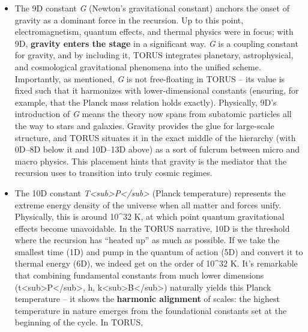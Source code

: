 \documentclass[]{article}
\begin{document}
{{\begin{itemize}
  marks the fully developed classical thermodynamics regime (PV = nRT,
  etc.), and having \emph{R} in the list explicitly acknowledges that
  the recursion has now reached the continuum limit of matter. It is a
  reassurance that what emerges at 8D is \emph{identical} to what we
  know from classical thermodynamics -- a continuity check.
\item
  The 9D constant \emph{G} (Newton's gravitational constant) anchors the
  onset of gravity as a dominant force in the recursion. Up to this
  point, electromagnetism, quantum effects, and thermal physics were in
  focus; with 9D, \textbf{gravity enters the stage} in a significant
  way. \emph{G} is a coupling constant for gravity, and by including it,
  TORUS integrates planetary, astrophysical, and cosmological
  gravitational phenomena into the unified scheme. Importantly, as
  mentioned, \emph{G} is not free-floating in TORUS -- its value is
  fixed such that it harmonizes with lower-dimensional constants
  (ensuring, for example, that the Planck mass relation holds exactly)​.
  Physically, 9D's introduction of \emph{G} means the theory now spans
  from subatomic particles all the way to stars and galaxies. Gravity
  provides the glue for large-scale structure, and TORUS situates it in
  the exact middle of the hierarchy (with 0D--8D below it and 10D--13D
  above) as a sort of fulcrum between micro and macro physics. This
  placement hints that gravity is the mediator that the recursion uses
  to transition into truly cosmic regimes.
\item
  The 10D constant
  \emph{T\textless{}sub\textgreater{}P\textless{}/sub\textgreater{}}
  (Planck temperature) represents the extreme energy density of the
  universe when all matter and forces unify. Physically, this is around
  10\^{}32 K, at which point quantum gravitational effects become
  unavoidable. In the TORUS narrative, 10D is the threshold where the
  recursion has ``heated up'' as much as possible​. If we take the
  smallest time (1D) and pump in the quantum of action (5D) and convert
  it to thermal energy (6D), we indeed get on the order of 10\^{}32 K​.
  It's remarkable that combining fundamental constants from much lower
  dimensions
  (t\textless{}sub\textgreater{}P\textless{}/sub\textgreater{}, h,
  k\textless{}sub\textgreater{}B\textless{}/sub\textgreater{}) naturally
  yields this Planck temperature -- it shows the \textbf{harmonic
  alignment} of scales: the highest temperature in nature emerges from
  the foundational constants set at the beginning of the cycle​. In
  TORUS,

\end{itemize}}}
\end{document}
